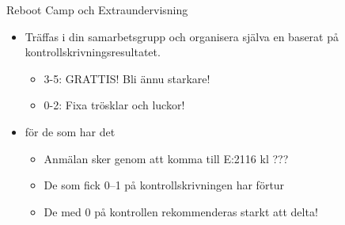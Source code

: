 
\begin{Slide}{Reboot Camp och Extraundervisning}

\begin{itemize}
  \item
  Träffas i din samarbetsgrupp och organisera själva en  baserat på kontrollskrivningsresultatet.

\begin{itemize}
  \item
  3-5: GRATTIS! Bli ännu starkare!
  \item
  0-2: Fixa trösklar och luckor!
\end{itemize}

\item {} för de som har det 
\begin{itemize}
  \item Anmälan sker genom att komma till E:2116 kl ???
  \item De som fick 0--1 på kontrollskrivningen har förtur
  \item De med 0 på kontrollen rekommenderas starkt att delta!
\end{itemize}

\end{itemize}


\vspace{0.5em}  \\\vspace{0.5em} 
\end{Slide}

